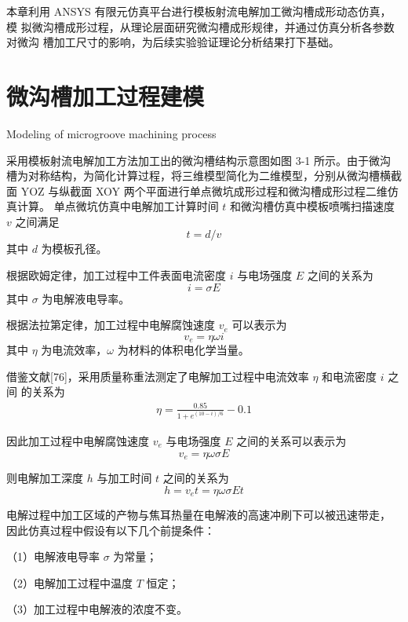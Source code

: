 \documentclass[
  type=doctor
]{../gdutthesis}
\begin{document}
本章利用 ANSYS 有限元仿真平台进行模板射流电解加工微沟槽成形动态仿真，模
拟微沟槽成形过程，从理论层面研究微沟槽成形规律，并通过仿真分析各参数对微沟
槽加工尺寸的影响，为后续实验验证理论分析结果打下基础。

\section{微沟槽加工过程建模}{Modeling of microgroove machining process}

采用模板射流电解加工方法加工出的微沟槽结构示意图如图 3-1 所示。由于微沟
槽为对称结构，为简化计算过程，将三维模型简化为二维模型，分别从微沟槽横截面
YOZ 与纵截面 XOY 两个平面进行单点微坑成形过程和微沟槽成形过程二维仿真计算。
单点微坑仿真中电解加工计算时间 $t$ 和微沟槽仿真中模板喷嘴扫描速度 $v$ 之间满足
\begin{equation}
  t = d/v
\end{equation}
其中 $d$ 为模板孔径。

根据欧姆定律，加工过程中工件表面电流密度 $i$ 与电场强度 $E$ 之间的关系为
\begin{equation}
  i = \sigma E
\end{equation}
其中 $σ$ 为电解液电导率。

根据法拉第定律，加工过程中电解腐蚀速度 $v_e$ 可以表示为
\begin{equation}
  𝑣_e = 𝜂𝜔𝑖
\end{equation}
其中 $η$ 为电流效率，$ω$ 为材料的体积电化学当量。

借鉴文献[76]，采用质量称重法测定了电解加工过程中电流效率 $𝜂$ 和电流密度 $𝑖$ 之间
的关系为
\begin{eqnarray}
  \eta = \frac{0.85}{1 + e^{(10-i)/6}} - 0.1
\end{eqnarray}

因此加工过程中电解腐蚀速度 $v_e$ 与电场强度 $E$ 之间的关系可以表示为
\begin{equation}
  𝑣_e = 𝜂𝜔𝜎𝐸
\end{equation}

则电解加工深度 $h$ 与加工时间 $t$ 之间的关系为
\begin{equation}
  ℎ = 𝑣_e 𝑡 = 𝜂𝜔𝜎𝐸𝑡
\end{equation}

电解过程中加工区域的产物与焦耳热量在电解液的高速冲刷下可以被迅速带走，
因此仿真过程中假设有以下几个前提条件：

（1）电解液电导率 $σ$ 为常量；

（2）电解加工过程中温度 $T$ 恒定；

（3）加工过程中电解液的浓度不变。
\end{document}

